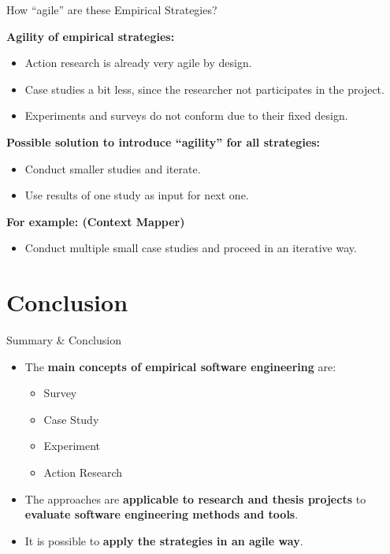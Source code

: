 \documentclass[10pt]{beamer}
\begin{document}
\begin{frame}{How ``agile'' are these Empirical Strategies?}

	\textbf{Agility of empirical strategies:}	
	
	\begin{itemize}
		\item Action research is already very agile by design.
		\item Case studies a bit less, since the researcher not participates in the project.
		\item Experiments and surveys do not conform due to their fixed design.
	\end{itemize}
	
	\textbf{Possible solution to introduce ``agility'' for all strategies:}
	\begin{itemize}
		\item Conduct smaller studies and iterate.
		\item Use results of one study as input for next one.	
	\end{itemize}		
	
	\bigskip
	\textbf{For example: (Context Mapper)}	
	\begin{itemize}
		\item Conduct multiple small case studies and proceed in an iterative way.
	\end{itemize}		
	
\end{frame}

\section{Conclusion}

\begin{frame}{Summary \& Conclusion}

	\begin{itemize}
		\item The \textbf{main concepts of empirical software engineering} are:
		\begin{itemize}
			\item Survey
			\item Case Study
			\item Experiment
			\item Action Research
		\end{itemize}
		\bigskip
		\item The approaches are \textbf{applicable to research and thesis projects} to \textbf{evaluate software engineering methods and tools}.
		\bigskip
		\item It is possible to \textbf{apply the strategies in an agile way}.
	\end{itemize}
	
\end{frame}
\end{document}
